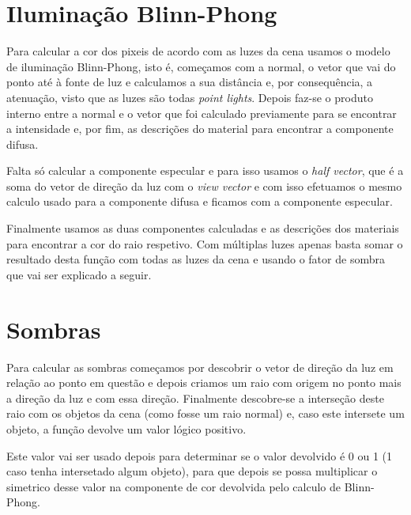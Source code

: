 \documentclass{article}
\begin{document}
    \section*{Iluminação Blinn-Phong}
        \par
        Para calcular a cor dos pixeis de acordo com as luzes da cena usamos o modelo de iluminação Blinn-Phong, isto é, começamos com a normal, 
        o vetor que vai do ponto até à fonte de luz e calculamos a sua distância e, por consequência, a atenuação, visto que as luzes são todas 
        \textit{point lights}. Depois faz-se o produto interno entre a normal e o vetor que foi calculado previamente para se encontrar a intensidade e, por fim, 
        as descrições do material para encontrar a componente difusa.
        \par
        Falta só calcular a componente especular e para isso usamos o \textit{half vector}, que é a soma do vetor de direção da luz com o \textit{view vector} e
        com isso efetuamos o mesmo calculo usado para a componente difusa e ficamos com a componente especular.
        \par
        Finalmente usamos as duas componentes calculadas e as descrições dos materiais para encontrar a cor do raio respetivo. Com múltiplas luzes apenas basta somar o resultado 
        desta função com todas as luzes da cena e usando o fator de sombra que vai ser explicado a seguir.
    \section*{Sombras}
        \par
        Para calcular as sombras começamos por descobrir o vetor de direção da luz em relação ao ponto em questão e
        depois criamos um raio com origem no ponto mais a direção da luz e com essa direção. Finalmente descobre-se a interseção deste raio com os objetos da cena (como 
        fosse um raio normal) e, caso este intersete um objeto, a função devolve um valor lógico positivo.
        \par
        Este valor vai ser usado depois para determinar se o valor devolvido é 0 ou 1 (1 caso tenha intersetado algum objeto), para que depois se possa 
        multiplicar o simetrico desse valor na componente de cor devolvida pelo calculo de Blinn-Phong.
\end{document}
